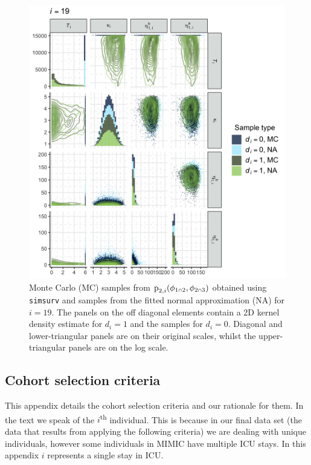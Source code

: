 \documentclass[
  10pt,
  a4paper,
]{article}
\let\Oldcap\cap
\renewcommand{\cap}{\mathrel{\mathsmaller{\Oldcap}}}
\newcommand{\pd}{\text{p}}
\begin{document}
\begin{figure}

{\centering \includegraphics{../plots/mimic-example/p3-prior-pairs/pairs-19} 

}

\caption{Monte Carlo (MC) samples from $\pd_{2, i}(\phi_{1 \cap 2}, \phi_{2 \cap 3})$ obtained using \texttt{simsurv} and samples from the fitted normal approximation (NA) for $i = 19$. The panels on the off diagonal elements contain a 2D kernel density estimate for $d_{i} = 1$ and the samples for $d_{i} = 0$. Diagonal and lower-triangular panels are on their original scales, whilst the upper-triangular panels are on the log scale.}\label{fig:surv_prior_plot_fit}
\end{figure}

\hypertarget{cohort-selection-criteria}{%
\subsection{Cohort selection criteria}\label{cohort-selection-criteria}}

This appendix details the cohort selection criteria and our rationale
for them. In the text we speak of the \(i\)\textsuperscript{th}
individual. This is because in our final data set (the data that results
from applying the following criteria) we are dealing with unique
individuals, however some individuals in MIMIC have multiple ICU stays.
In this appendix \(i\) represents a single stay in ICU.
\end{document}
